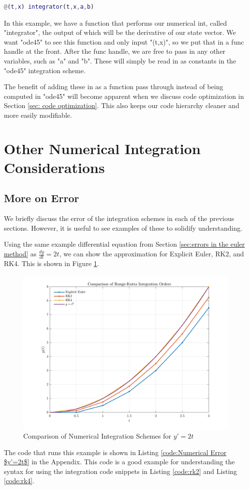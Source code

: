 \documentclass[12pt]{report}
\begin{document}
\begin{lstlisting}[language=Matlab]
@(t,x) integrator(t,x,a,b)
\end{lstlisting}
In this example, we have a function that performs our \gls{numerical int}, called "integrator", the output of which will be the derivative of our \gls{state vector}. We want "ode45" to see this function and only input "(t,x)", so we put that in a \gls{func handle} at the front. After the \gls{func handle}, we are free to pass in any other variables, such as "a" and "b". These will simply be read in as constants in the "ode45" integration scheme.

The benefit of adding these in as a function pass through instead of being computed in "ode45" will become apparent when we discuss code optimization in Section \ref{sec: code optimization}. This also keeps our code hierarchy cleaner and more easily modifiable.

\section{Other Numerical Integration Considerations}\label{sec:other numerical ints}
\subsection{More on Error}
We briefly discuss the error of the integration schemes in each of the previous sections. However, it is useful to see examples of these to solidify understanding. 

Using the same example differential equation from Section \ref{sec:errors in the euler method} as $\frac{dy}{dt}=2t$, we can show the approximation for Explicit Euler, RK2, and RK4. This is shown in Figure \ref{fig:Numerical Comparison}.
\begin{figure}[ht]
    \centering
    \includegraphics[width=\linewidth]{6DoF Explanation Scripts/Numerical Integrator Comparison Figure.png}
    \caption{Comparison of Numerical Integration Schemes for $y'=2t$}
    \label{fig:Numerical Comparison}
\end{figure}
The code that runs this example is shown in Listing \ref{code:Numerical Error $y'=2t$} in the Appendix. This code is a good example for understanding the syntax for using the integration code snippets in Listing \ref{code:rk2} and Listing \ref{code:rk4}.
\end{document}

